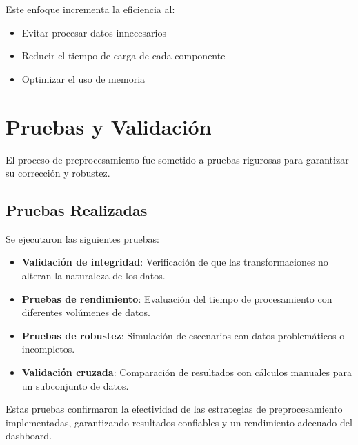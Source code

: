 Este enfoque incrementa la eficiencia al:
\begin{itemize}
    \item Evitar procesar datos innecesarios
    \item Reducir el tiempo de carga de cada componente
    \item Optimizar el uso de memoria
\end{itemize}

\section{Pruebas y Validación}
El proceso de preprocesamiento fue sometido a pruebas rigurosas para garantizar su corrección y robustez.

\subsection{Pruebas Realizadas}
Se ejecutaron las siguientes pruebas:

\begin{itemize}
    \item \textbf{Validación de integridad}: Verificación de que las transformaciones no alteran la naturaleza de los datos.
    \item \textbf{Pruebas de rendimiento}: Evaluación del tiempo de procesamiento con diferentes volúmenes de datos.
    \item \textbf{Pruebas de robustez}: Simulación de escenarios con datos problemáticos o incompletos.
    \item \textbf{Validación cruzada}: Comparación de resultados con cálculos manuales para un subconjunto de datos.
\end{itemize}

Estas pruebas confirmaron la efectividad de las estrategias de preprocesamiento implementadas, garantizando resultados confiables y un rendimiento adecuado del dashboard.

